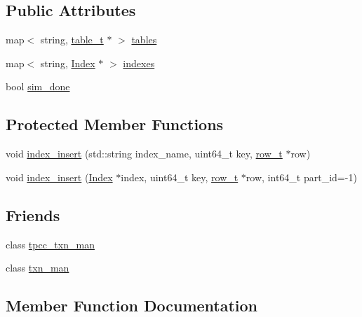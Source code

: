 \subsection*{Public Attributes}
\begin{DoxyCompactItemize}
\item 
map$<$ string, \hyperlink{classtable__t}{table\+\_\+t} $\ast$ $>$ \hyperlink{classworkload_a35ca60eab63190c0667225df31555677}{tables}
\item 
map$<$ string, \hyperlink{classIndex}{Index} $\ast$ $>$ \hyperlink{classworkload_a7b0952cf3cecba206343b2b22ee67ee9}{indexes}
\item 
bool \hyperlink{classworkload_adebf7ae095ae33d23c7bdd5c30a13787}{sim\+\_\+done}
\end{DoxyCompactItemize}
\subsection*{Protected Member Functions}
\begin{DoxyCompactItemize}
\item 
void \hyperlink{classworkload_ae88a8556d1384e6ba6bd5aa01dddaf60}{index\+\_\+insert} (std\+::string index\+\_\+name, uint64\+\_\+t key, \hyperlink{classrow__t}{row\+\_\+t} $\ast$row)
\item 
void \hyperlink{classworkload_a9fb849d3df28fea4e00353f046c130a2}{index\+\_\+insert} (\hyperlink{classIndex}{Index} $\ast$index, uint64\+\_\+t key, \hyperlink{classrow__t}{row\+\_\+t} $\ast$row, int64\+\_\+t part\+\_\+id=-\/1)
\end{DoxyCompactItemize}
\subsection*{Friends}
\begin{DoxyCompactItemize}
\item 
class \hyperlink{classworkload_a7e57327617727745c74d4598cc485212}{tpcc\+\_\+txn\+\_\+man}
\item 
class \hyperlink{classworkload_a128ce032b45a6a15c2dc63fe34da7d42}{txn\+\_\+man}
\end{DoxyCompactItemize}


\subsection{Member Function Documentation}
\mbox{\label{classworkload_a60bc113bb23268942b6fe36e99c47caa}} 
